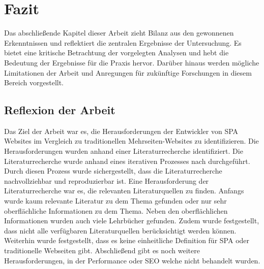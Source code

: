 \section{Fazit}
Das abschließende Kapitel dieser Arbeit zieht Bilanz aus den gewonnenen Erkenntnissen und reflektiert die zentralen Ergebnisse der Untersuchung.
Es bietet eine kritische Betrachtung der vorgelegten Analysen und hebt die Bedeutung der Ergebnisse für die Praxis hervor.
Darüber hinaus werden mögliche Limitationen der Arbeit und Anregungen für zukünftige Forschungen in diesem Bereich vorgestellt.

\subsection{Reflexion der Arbeit}
Das Ziel der Arbeit war es, die Herausforderungen der Entwickler von \ac{SPA} Websites im Vergleich zu traditionellen Mehrseiten-Websites zu identifizieren.
Die Herausforderungen wurden anhand einer Literaturrecherche identifiziert.
Die Literaturrecherche wurde anhand eines iterativen Prozesses nach \citeauthor{conf/ecis/BrockeSNRPC09} durchgeführt.
Durch diesen Prozess wurde sichergestellt, dass die Literaturrecherche nachvollziehbar und reproduzierbar ist.
Eine Herausforderung der Literaturrecherche war es, die relevanten Literaturquellen zu finden.
Anfangs wurde kaum relevante Literatur zu dem Thema gefunden oder nur sehr oberflächliche Informationen zu dem Thema.
Neben den oberflächlichen Informationen wurden auch viele Lehrbücher gefunden.
Zudem wurde festgestellt, dass nicht alle verfügbaren Literaturquellen berücksichtigt werden können.
Weiterhin wurde festgestellt, dass es keine einheitliche Definition für \ac{SPA} oder traditionelle Webseiten gibt.
Abschließend gibt es noch weitere Herausforderungen, in der Performance oder \ac{SEO} welche nicht behandelt wurden.


